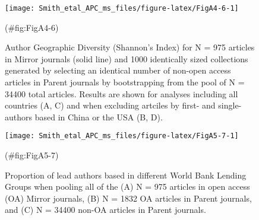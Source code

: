 \begin{appendix}
\begin{figure}

{\centering \texttt{[image: Smith\_etal\_APC\_ms\_files/figure-latex/FigA4-6-1]} 

}

\caption{Author Geographic Diversity (Shannon's Index) for N =  975  articles in Mirror journals (solid line) and 1000 identically sized collections generated by selecting an identical number of non-open access articles in Parent journals by bootstrapping from the pool of N =  34400  total articles. Results are shown for analyses including all countries (A, C) and when excluding artciles by first- and single-authors based in China or the USA (B, D).}(\#fig:FigA4-6)
\end{figure}

\begin{figure}

{\centering \texttt{[image: Smith\_etal\_APC\_ms\_files/figure-latex/FigA5-7-1]} 

}

\caption{Proportion of lead authors based in different World Bank Lending Groups when pooling all of the (A) N =  975  articles in open access (OA) Mirror journals, (B) N =   1832  OA articles in Parent journals, and (C) N =   34400  non-OA articles in Parent journals.}(\#fig:FigA5-7)
\end{figure}

\newpage
\blandscape

\begin{table}


\end{table}
\end{appendix}
